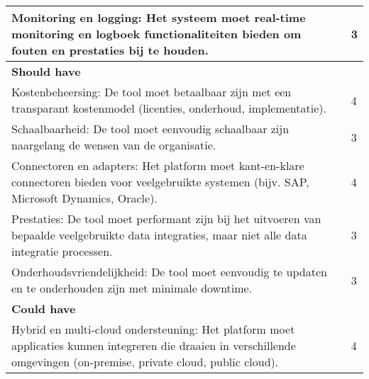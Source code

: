 \begin{landscape}
\begin{table}[H]
{\begin{tabular}{|ll|}
\multicolumn{1}{|l|}{Monitoring en logging: Het systeem moet real-time monitoring en logboek functionaliteiten bieden om fouten en prestaties bij te houden.}                                                              & 3                            \\ \hline
\textbf{Should have}                                                                                                                                                                                                       &                              \\ \hline
\multicolumn{1}{|l|}{Kostenbeheersing: De tool moet betaalbaar zijn met een transparant kostenmodel (licenties, onderhoud, implementatie).}                                                                                & 4                            \\ \hline
\multicolumn{1}{|l|}{Schaalbaarheid: De tool moet eenvoudig schaalbaar zijn naargelang de wensen van de organisatie.}                                                                                                      & 3                            \\ \hline
\multicolumn{1}{|l|}{Connectoren en adapters: Het platform moet kant-en-klare connectoren bieden voor veelgebruikte systemen (bijv. SAP, Microsoft Dynamics, Oracle).}                                                     & 4                            \\ \hline
\multicolumn{1}{|l|}{Prestaties: De tool moet performant zijn bij het uitvoeren van bepaalde veelgebruikte data integraties, maar niet alle data integratie processen.}                                                    & 3                            \\ \hline
\multicolumn{1}{|l|}{Onderhoudsvriendelijkheid: De tool moet eenvoudig te updaten en te onderhouden zijn met minimale downtime.}                                                                                           & 3                            \\ \hline
\textbf{Could have}                                                                                                                                                                                                        &                              \\ \hline
\multicolumn{1}{|l|}{Hybrid en multi-cloud ondersteuning: Het platform moet applicaties kunnen integreren die draaien in verschillende omgevingen (on-premise, private cloud, public cloud).}                              & 4                            \\ \hline

\end{tabular}}
\end{table}
\end{landscape}
